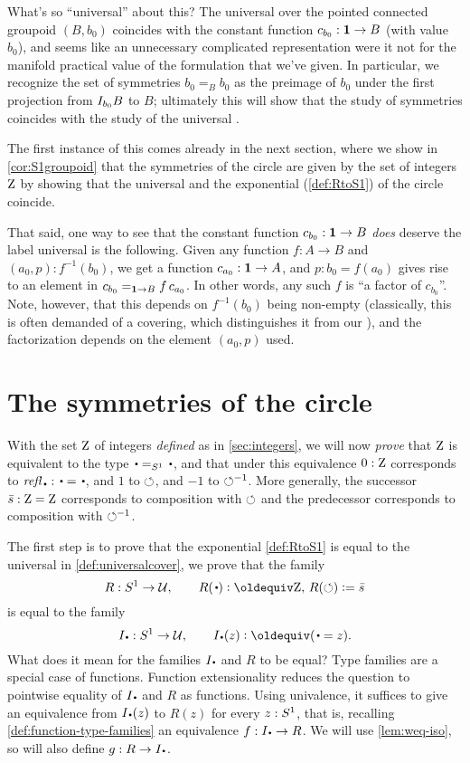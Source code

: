 \begin{remark}
  What's so ``universal'' about this?
The universal \covering over the pointed connected groupoid $(B,b_0)$ coincides with the constant function $c_{b_0}:\mathbf{1}\to B$ (with value $b_0$), and seems like an unnecessary complicated representation were it not for the manifold practical value of the formulation that we've given.  
In particular, we recognize the set of symmetries $b_0=_Bb_0$ as the preimage of $b_0$ under the first projection from ${I_{b_0}}B$ to $B$; ultimately this will show that the study of symmetries coincides with the study of the universal \covering.

The first instance of this comes already in the next section, where we show in \cref{cor:S1groupoid} that the symmetries of the circle are given by the set of integers $\mathrm{Z}$ by showing that the universal \covering and the exponential \covering (\cref{def:RtoS1}) of the circle coincide.

That said, one way to see that the constant function $c_{b_0}:\mathbf{1}\to B$
\emph{does} deserve the label universal is the following. 
Given any function $f:A\to B$ and $(a_0,p): f^{-1}(b_0)$, 
we get a function $c_{a_0}:\mathbf{1}\to A$, and $p:b_0=f(a_0)$ gives rise to
an element in $c_{b_0}=_{\mathbf{1}\to B}f\, c_{a_0}$.  
In other words, any such $f$ is ``a factor of $c_{b_0}$''.  
Note, however, that this depends on $f^{-1}(b_0)$ being non-empty
(classically, this is often demanded of a covering, which distinguishes it from our \coverings), 
and the factorization depends on the element $(a_0,p)$ used. 
\end{remark}



\section{The symmetries of the circle}
\label{sec:pi1S1isZ}\label{sec:symcirc}

With the set $\mathrm{Z}$ of integers \emph{defined} as in \cref{sec:integers}, 
we will now \emph{prove} that $\mathrm{Z}$ is equivalent to the type 
$\base=_{\Sc}\base$, and that under this equivalence $0:\mathrm{Z}$ corresponds to 
$\refl{\base}:\base=\base$, and $1$ to $\circlearrowleft$, and $-1$ to $\circlearrowleft^{-1}$. 
More generally, the successor $\bar {s}:\mathrm{Z}=\mathrm{Z}$ corresponds to composition with $\circlearrowleft$
and the predecessor corresponds to composition with $\circlearrowleft^{-1}$.

The first step is to prove that the exponential \covering \cref{def:RtoS1} 
is equal to the universal \covering in \cref{def:universalcover}, 
\ie we prove that the family 
\[
R: \Sc\to\UU,\qquad R(\base)\defeq\zet,\, R(\Sloop)\defis \etop{s}
\]
is equal to the family
\[
\uc{\base}:\Sc\to\UU,\qquad \uc{\base}(z)\defeq (\base=z).
\]
What does it mean for the families $\uc{\base}$ and $R$ to be equal?
Type families are a special case of functions. 
Function extensionality reduces the question to pointwise equality
of $\uc{\base}$ and $R$ as functions.
Using univalence, it suffices to give
an equivalence from $\uc{\base}(z)$ to $R(z)$ for every $z:{S^1}$,
that is, recalling \cref{def:function-type-families}
an equivalence $f: \uc{\base}\to R$. We will use
\cref{lem:weq-iso}, so will also define $g: R\to\uc{\base}$.

